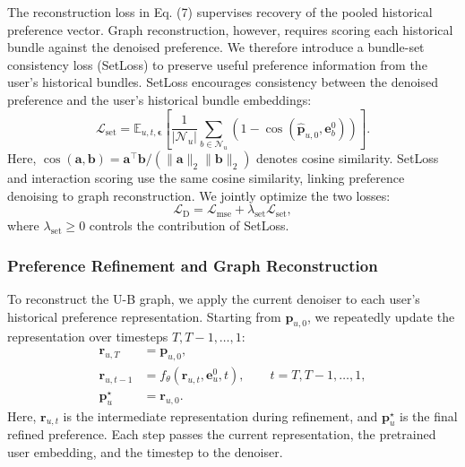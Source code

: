 \documentclass[letterpaper,journal]{IEEEtran}
\begin{document}
The reconstruction loss in Eq. (7) supervises recovery of the pooled historical preference vector. Graph reconstruction, however, requires scoring each historical bundle against the denoised preference. We therefore introduce a bundle-set consistency loss (SetLoss) to preserve useful preference information from the user's historical bundles. SetLoss encourages consistency between the denoised preference and the user's historical bundle embeddings:
\begin{equation}
\mathcal L_{\mathrm{set}}
=\mathbb E_{u,t,\boldsymbol\epsilon}
\left[
\frac{1}{|\mathcal N_u|}
\sum_{b\in\mathcal N_u}
\left(1-\cos
\left(\widehat{\mathbf p}_{u,0},\mathbf e_b^0\right)\right)
\right].
\tag{8}
\end{equation}
Here, $\cos(\mathbf a,\mathbf b)=\mathbf a^\top\mathbf b/(\|\mathbf a\|_2\|\mathbf b\|_2)$ denotes cosine similarity. SetLoss and interaction scoring use the same cosine similarity, linking preference denoising to graph reconstruction. We jointly optimize the two losses:
\begin{equation}
\mathcal L_{\mathrm D}
=\mathcal L_{\mathrm{mse}}
+\lambda_{\mathrm{set}}\mathcal L_{\mathrm{set}},
\tag{9}
\end{equation}
where $\lambda_{\mathrm{set}}\geq 0$ controls the contribution of SetLoss.

\subsubsection{Preference Refinement and Graph Reconstruction}

To reconstruct the U-B graph, we apply the current denoiser to each user's historical preference representation. Starting from $\mathbf p_{u,0}$, we repeatedly update the representation over timesteps $T,T-1,\ldots,1$:
\begin{equation}
\begin{aligned}
\mathbf r_{u,T}&=\mathbf p_{u,0},\\
\mathbf r_{u,t-1}
&=f_\theta(\mathbf r_{u,t},\mathbf e_u^0,t),
\qquad t=T,T-1,\ldots,1,\\
\mathbf p_u^\star&=\mathbf r_{u,0}.
\end{aligned}
\tag{10}
\end{equation}
Here, $\mathbf r_{u,t}$ is the intermediate representation during refinement, and $\mathbf p_u^\star$ is the final refined preference. Each step passes the current representation, the pretrained user embedding, and the timestep to the denoiser.
\end{document}
